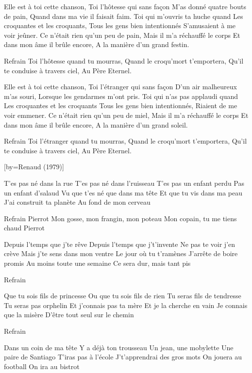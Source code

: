 \beginverse
Elle est à toi cette chanson, 
Toi l'hôtesse qui sans façon
M'as donné quatre bouts de pain,
Quand dans ma vie il faisait faim.
Toi qui m'ouvris ta huche quand
Les croquantes et les croquants,
Tous les gens bien intentionnés
S'amusaient à me voir jeûner.
Ce n'était rien qu'un peu de pain,
Mais il m'a réchauffé le corps
Et dans mon âme il brûle encore,
A la manière d'un grand festin.
\endverse

	Refrain
Toi l'hôtesse quand tu mourras,
Quand le croqu'mort t'emportera,
Qu'il te conduise à travers ciel,
Au Père Eternel.

\beginverse
Elle est à toi cette chanson,
Toi l'étranger qui sans façon
D'un air malheureux m'as souri,
Lorsque les gendarmes m'ont pris.
Toi qui n'as pas applaudi quand
Les croquantes et les croquants
Tous les gens bien intentionnés,
Riaient de me voir emmener.
Ce n'était rien qu'un peu de miel,
Mais il m'a réchauffé le corps
Et dans mon âme il brûle encore,
A la manière d'un grand soleil.
\endverse

	Refrain
Toi l'étranger quand tu mourras,
Quand le croqu'mort t'emportera,
Qu'il te conduise à travers ciel,
Au Père Eternel.

[by={Renaud (1979)}]

\beginverse
T'es pas né dans la rue
T'es pas né dans l'ruisseau
T'es pas un enfant perdu
Pas un enfant d'salaud
Vu que t'es né que dans ma tête
Et que tu vis dans ma peau
J'ai construit ta planète
Au fond de mon cerveau
\endverse

\beginverse
Refrain
Pierrot
Mon gosse, mon frangin, mon poteau
Mon copain, tu me tiens chaud
Pierrot
\endverse

\beginverse
Depuis l'temps que j'te rêve
Depuis l'temps que j't'invente
Ne pas te voir j'en crève
Mais j'te sens dans mon ventre
Le jour où tu t'ramènes
J'arrête de boire promis
Au moins toute une semaine
Ce sera dur, mais tant pis
\endverse

\beginverse
Refrain
\endverse

\beginverse
Que tu sois fils de princesse
Ou que tu sois fils de rien
Tu seras fils de tendresse
Tu seras pas orphelin
Et j'connais pas ta mère
Et je la cherche en vain
Je connais que la misère
D'être tout seul sur le chemin
\endverse

\beginverse
Refrain
\endverse

\beginverse
Dans un coin de ma tête
Y a déjà ton trousseau
Un jean, une mobylette
Une paire de Santiago
T'iras pas à l'école
J't'apprendrai des gros mots
On jouera au football
On ira au bistrot
\endverse

